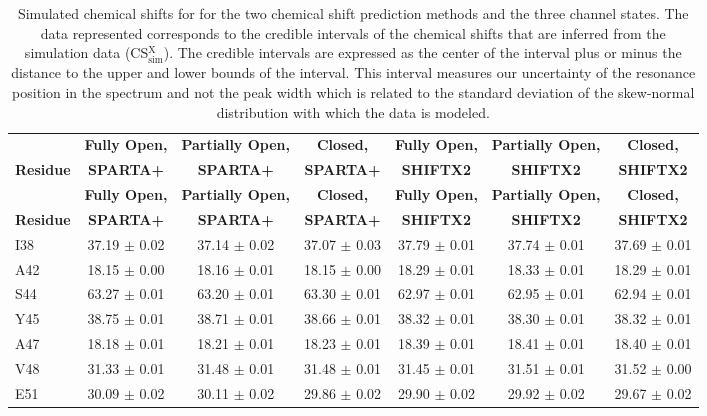 \documentclass[%
 aip,
 amsmath,amssymb,
 preprint,%
]{revtex4-1}
\newcommand{\cb}{\ce{C_\beta} }
\begin{document}
\begingroup
\begin{center}
\begin{longtable}{l|c|c|c|c|c|c}
\caption{\scriptsize Simulated chemical shifts for \cb for the two chemical shift prediction methods and the three channel states. The data represented corresponds to the credible intervals of the chemical shifts that are inferred from the simulation data (CS$_\text{sim}^\text{X}$). The credible intervals are expressed as the center of the interval plus or minus the distance to the upper and lower bounds of the interval. This interval measures our uncertainty of the resonance position in the spectrum and not the peak width which is related to the standard deviation of the skew-normal distribution with which the data is modeled. \label{SI_tb_CSsim_CB}}\\ 
\hline 
\hline 
& \textbf{Fully Open,} & \textbf{Partially Open,} & \textbf{Closed,} & \textbf{Fully Open,} & \textbf{Partially Open,} & \textbf{Closed,}  \\
\textbf{Residue} & \textbf{SPARTA+} & \textbf{SPARTA+} & \textbf{SPARTA+} & \textbf{SHIFTX2} & \textbf{SHIFTX2} & \textbf{SHIFTX2}  \\
\hline
\endfirsthead 
\hline
& \textbf{Fully Open,} & \textbf{Partially Open,} & \textbf{Closed,} & \textbf{Fully Open,} & \textbf{Partially Open,} & \textbf{Closed,}  \\
\textbf{Residue} & \textbf{SPARTA+} & \textbf{SPARTA+} & \textbf{SPARTA+} & \textbf{SHIFTX2} & \textbf{SHIFTX2} & \textbf{SHIFTX2}  \\ \hline
\endhead
I38 & 37.19 $\pm$ 0.02 & 37.14 $\pm$ 0.02 & 37.07 $\pm$ 0.03 & 37.79 $\pm$ 0.01 & 37.74 $\pm$ 0.01 & 37.69 $\pm$ 0.01 \\
A42 & 18.15 $\pm$ 0.00 & 18.16 $\pm$ 0.01 & 18.15 $\pm$ 0.00 & 18.29 $\pm$ 0.01 & 18.33 $\pm$ 0.01 & 18.29 $\pm$ 0.01 \\
S44 & 63.27 $\pm$ 0.01 & 63.20 $\pm$ 0.01 & 63.30 $\pm$ 0.01 & 62.97 $\pm$ 0.01 & 62.95 $\pm$ 0.01 & 62.94 $\pm$ 0.01 \\
Y45 & 38.75 $\pm$ 0.01 & 38.71 $\pm$ 0.01 & 38.66 $\pm$ 0.01 & 38.32 $\pm$ 0.01 & 38.30 $\pm$ 0.01 & 38.32 $\pm$ 0.01 \\
A47 & 18.18 $\pm$ 0.01 & 18.21 $\pm$ 0.01 & 18.23 $\pm$ 0.01 & 18.39 $\pm$ 0.01 & 18.41 $\pm$ 0.01 & 18.40 $\pm$ 0.01 \\
V48 & 31.33 $\pm$ 0.01 & 31.48 $\pm$ 0.01 & 31.48 $\pm$ 0.01 & 31.45 $\pm$ 0.01 & 31.51 $\pm$ 0.01 & 31.52 $\pm$ 0.00 \\
E51 & 30.09 $\pm$ 0.02 & 30.11 $\pm$ 0.02 & 29.86 $\pm$ 0.02 & 29.90 $\pm$ 0.02 & 29.92 $\pm$ 0.02 & 29.67 $\pm$ 0.02 \\

\end{longtable}
\end{center}
\end{document}

